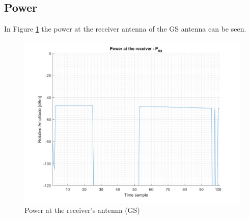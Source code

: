 \subsection{Power}
In Figure \ref{fig:s4_power} the power at the receiver antenna of the GS antenna can be seen.

\begin{figure}[H]
\centering
\includegraphics[scale=0.75]{figures/scenario_4_power.png}
\caption{Power at the receiver's antenna (GS)}
\label{fig:s4_power}
\end{figure}